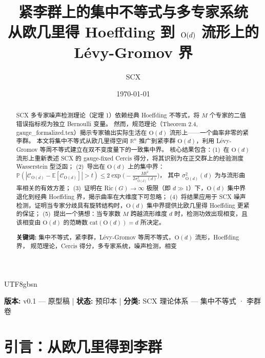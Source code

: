 \documentclass[12pt,a4paper]{article}
\title{
    {\Huge \textbf{紧李群上的集中不等式与多专家系统}}\\[0.5em]
    {\Large 从欧几里得 Hoeffding 到 $\Od$ 流形上的 Lévy-Gromov 界}
}
\author{SCX}
\date{\today}
\theoremstyle{plain}
\theoremstyle{definition}
\theoremstyle{remark}
\newcommand{\R}{\mathbb{R}}
\newcommand{\E}{\mathbb{E}}
\newcommand{\Pbb}{\mathbb{P}}
\newcommand{\Od}{\mathrm{O}(d)}
\newcommand{\cercis}{\mathcal{C}}
\begin{document}
\begin{CJK}{UTF8}{gbsn}
\maketitle

\begin{center}
\footnotesize
\textbf{版本:} v0.1 — 原型稿 \quad | \quad
\textbf{状态:} 预印本 \quad | \quad
\textbf{分类:} SCX 理论体系 — 集中不等式 · 李群卷
\end{center}

\begin{abstract}

\noindent
SCX 多专家噪声检测理论（定理 1）依赖经典 Hoeffding 不等式，将 $M$ 个专家的二值错误指标视为独立 Bernoulli 变量。
然而，规范理论（Theorem 2.4, gauge\_formalized.tex）揭示专家输出实际生活在 $\Od$ 流形上——一个曲率非零的紧李群。
本文将集中不等式从欧几里得空间 $\R^n$ 推广到紧李群 $\Od$，利用 Lévy-Gromov 等周不等式建立在双不变度量下的一致集中界。
核心结果包含：(1)~在 $\Od$ 流形上重新表述 SCX 的 gauge-fixed Cercis 得分，将其识别为在正交群上的经验测度 Wasserstein 型泛函；
(2)~导出在 $\Od$ 上的集中界：
$\Pbb(|\cercis_{\Od} - \E[\cercis_{\Od}]| > t) \leq 2\exp\!\bigl(-\frac{M t^2}{2\sigma^2_{\Od}(d)}\bigr)$，
其中 $\sigma^2_{\Od}(d)$ 为与流形曲率相关的有效方差；
(3)~证明在 Ric$(G) \to \infty$ 极限（即 $d \gg 1$）下，$\Od$ 集中界退化到经典 Hoeffding 界，揭示曲率在大维度下可忽略；
(4)~将结果应用于 SCX 噪声检测，证明当专家分歧具有旋转结构时，$\Od$ 集中界提供比欧几里得 Hoeffding 更紧的保证；
(5)~提出一个猜想：当专家数 $M$ 跨越流形维度 $d$ 时，检测功效出现相变，且该相变由 $\Od$ 的范畴数 $\mathrm{cat}(\Od) = d$ 所决定。

\vspace{0.8em}
\noindent\textbf{关键词:}
集中不等式，紧李群，Lévy-Gromov 等周不等式，$\Od$ 流形，Hoeffding 界，
规范理论，Cercis 得分，多专家系统，噪声检测，相变

\end{abstract}

\newpage
\tableofcontents
\newpage

\section{引言：从欧几里得到李群}


\end{CJK}
\end{document}
